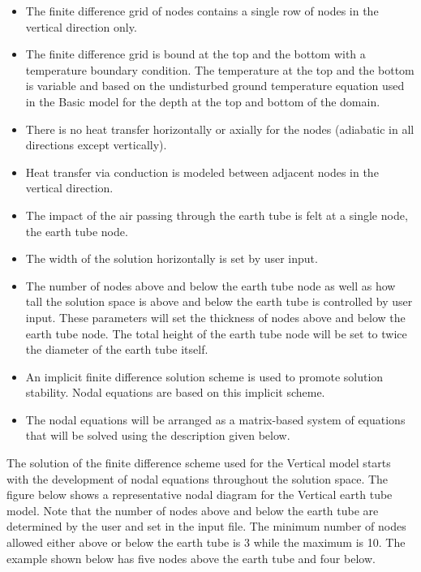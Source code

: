 \begin{itemize}
\item
The finite difference grid of nodes contains a single row of nodes in the vertical direction only.
\item
The finite difference grid is bound at the top and the bottom with a temperature boundary condition.  The temperature at the top and the bottom is variable and based on the undisturbed ground temperature equation used in the Basic model for the depth at the top and bottom of the domain.
\item
There is no heat transfer horizontally or axially for the nodes (adiabatic in all directions except vertically).
\item
Heat transfer via conduction is modeled between adjacent nodes in the vertical direction.
\item
The impact of the air passing through the earth tube is felt at a single node, the earth tube node.
\item
The width of the solution horizontally is set by user input.
\item
The number of nodes above and below the earth tube node as well as how tall the solution space is above and below the earth tube is controlled by user input.  These parameters will set the thickness of nodes above and below the earth tube node.  The total height of the earth tube node will be set to twice the diameter of the earth tube itself.
\item
An implicit finite difference solution scheme is used to promote solution stability.  Nodal equations are based on this implicit scheme.
\item
The nodal equations will be arranged as a matrix-based system of equations that will be solved using the description given below.
\end{itemize}

The solution of the finite difference scheme used for the Vertical model starts with the development of nodal equations throughout the solution space.  The figure below shows a representative nodal diagram for the Vertical earth tube model.  Note that the number of nodes above and below the earth tube are determined by the user and set in the input file.  The minimum number of nodes allowed either above or below the earth tube is 3 while the maximum is 10.  The example shown below has five nodes above the earth tube and four below.

